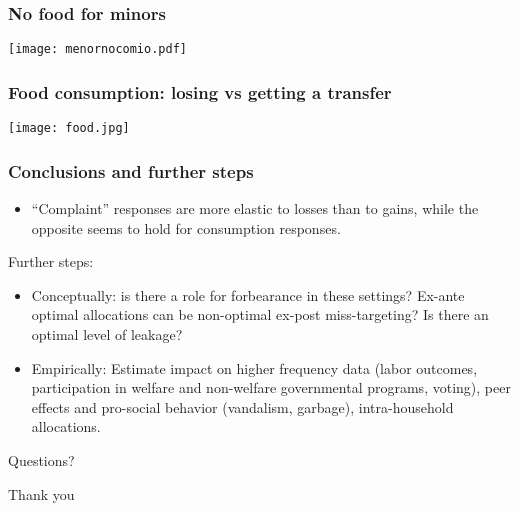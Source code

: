 \documentclass{beamer}
\begin{document}
\begin{frame}
\frametitle{No food for minors}
\begin{center}
\texttt{[image: menornocomio.pdf]}
\label{menornocomio}
\end{center}
\end{frame}

\begin{frame}
\frametitle{Food consumption: losing vs getting a transfer}
\begin{center}
	\texttt{[image: food.jpg]}
	\label{food}
\end{center}
\end{frame}


\begin{frame}
\frametitle{Conclusions and further steps}
\begin{itemize}
	\item ``Complaint'' responses are more elastic to losses than to gains, while the opposite seems to hold for consumption responses.
\end{itemize}
Further steps:
\begin{itemize}
	\item Conceptually: is there a role for forbearance in these settings? Ex-ante optimal allocations can be non-optimal ex-post miss-targeting? Is there an optimal level of leakage?
	\item Empirically: Estimate impact on higher frequency data (labor outcomes, participation in welfare and non-welfare governmental programs, voting), peer effects and pro-social behavior (vandalism, garbage), intra-household allocations.
\end{itemize}

\end{frame}

\begin{frame}
\begin{center}
	{\Huge Questions?\par}
\end{center}
\end{frame}

\begin{frame}
\begin{center}
	{\Huge Thank you\par}
\end{center}
\end{frame}
\end{document}
